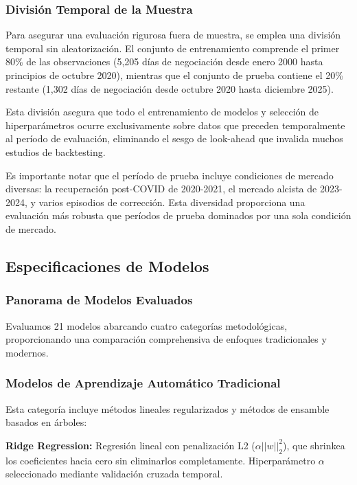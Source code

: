 \documentclass[11pt,a4paper]{article}
\begin{document}
\subsubsection{División Temporal de la Muestra}

Para asegurar una evaluación rigurosa fuera de muestra, se emplea una división temporal sin aleatorización. El conjunto de entrenamiento comprende el primer 80\% de las observaciones (5,205 días de negociación desde enero 2000 hasta principios de octubre 2020), mientras que el conjunto de prueba contiene el 20\% restante (1,302 días de negociación desde octubre 2020 hasta diciembre 2025).

Esta división asegura que todo el entrenamiento de modelos y selección de hiperparámetros ocurre exclusivamente sobre datos que preceden temporalmente al período de evaluación, eliminando el sesgo de look-ahead que invalida muchos estudios de backtesting.

Es importante notar que el período de prueba incluye condiciones de mercado diversas: la recuperación post-COVID de 2020-2021, el mercado alcista de 2023-2024, y varios episodios de corrección. Esta diversidad proporciona una evaluación más robusta que períodos de prueba dominados por una sola condición de mercado.

\subsection{Especificaciones de Modelos}

\subsubsection{Panorama de Modelos Evaluados}

Evaluamos 21 modelos abarcando cuatro categorías metodológicas, proporcionando una comparación comprehensiva de enfoques tradicionales y modernos.

\subsubsection{Modelos de Aprendizaje Automático Tradicional}

Esta categoría incluye métodos lineales regularizados y métodos de ensamble basados en árboles:

\textbf{Ridge Regression:} Regresión lineal con penalización L2 ($\alpha ||w||_2^2$), que shrinkea los coeficientes hacia cero sin eliminarlos completamente. Hiperparámetro $\alpha$ seleccionado mediante validación cruzada temporal.
\end{document}
